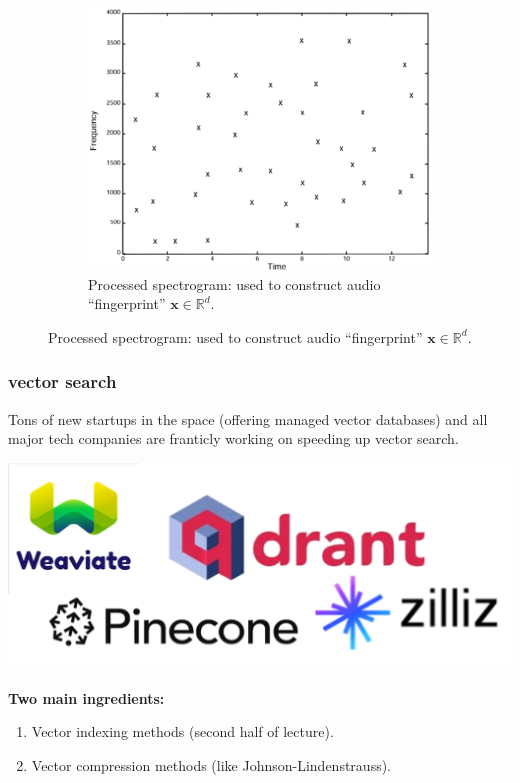 \documentclass[compress]{beamer}
\newcommand{\R}{\mathbb{R}}
\begin{document}
\begin{frame}
{\begin{figure}[h]
\begin{subfigure}[t]{0.45\textwidth}
							\centering
							\includegraphics[width=\textwidth]{spectrogramThresh.png}
							\caption{Processed spectrogram: used to construct audio ``fingerprint'' $\textbf{x}\in \R^d$.}
						\end{subfigure}
				\end{figure}
		}
\end{frame}

\begin{frame}
	\frametitle{vector search}
	Tons of new startups in the space (offering managed vector databases) and all major tech companies are franticly working on speeding up vector search. 
	\begin{center}
		\vspace{-.5em}
				\includegraphics[width=.6\textwidth]{startups.png}
				\vspace{-.5em}
	\end{center}
	\textbf{Two main ingredients:}
	\begin{enumerate}
	\item Vector indexing methods (second half of lecture).
	\item Vector compression methods (like Johnson-Lindenstrauss).
	\end{enumerate}
\end{frame}
\end{document}
